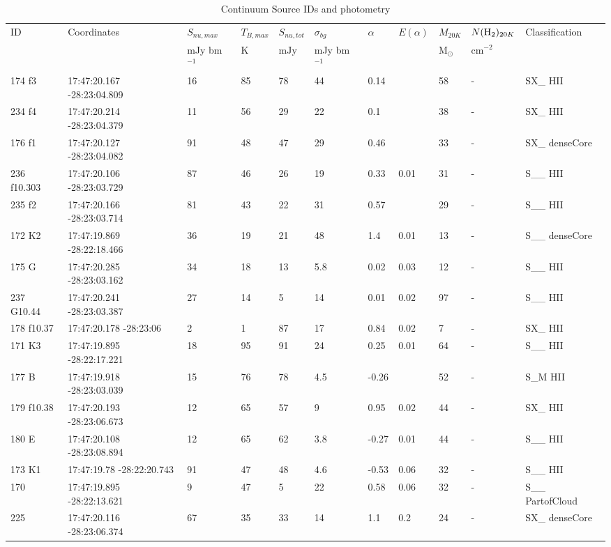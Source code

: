\begin{table}[htp]
\caption{Continuum Source IDs and photometry}
\begin{tabular}{lllllllllll}
\label{tab:photometry}
\footnotesize
ID & Coordinates & $S_{nu,max}$ & $T_{B,max}$ & $S_{nu,tot}$ & $\sigma_{bg}$ & $\alpha$ & $E(\alpha)$ & $M_{20K}$ & $N(\textrm{H}_{2})_{20 K}$ & Classification \\
 &  & mJy bm$^{-1}$ & $\mathrm{K}$ & $\mathrm{mJy}$ & mJy bm$^{-1}$ &  &  & $\mathrm{M_{\odot}}$ & $\mathrm{cm^{-2}}$ &  \\
\hline
174 f3 & 17:47:20.167 -28:23:04.809 & 16 & 85 & 78 & 44 & 0.14 &  & 58 & - & SX\_ HII \\
234 f4 & 17:47:20.214 -28:23:04.379 & 11 & 56 & 29 & 22 & 0.1 &  & 38 & - & SX\_ HII \\
176 f1 & 17:47:20.127 -28:23:04.082 & 91 & 48 & 47 & 29 & 0.46 &  & 33 & - & SX\_ denseCore \\
236 f10.303 & 17:47:20.106 -28:23:03.729 & 87 & 46 & 26 & 19 & 0.33 & 0.01 & 31 & - & S\_\_ HII \\
235 f2 & 17:47:20.166 -28:23:03.714 & 81 & 43 & 22 & 31 & 0.57 &  & 29 & - & S\_\_ HII \\
172 K2 & 17:47:19.869 -28:22:18.466 & 36 & 19 & 21 & 48 & 1.4 & 0.01 & 13 & - & S\_\_ denseCore \\
175 G & 17:47:20.285 -28:23:03.162 & 34 & 18 & 13 & 5.8 & 0.02 & 0.03 & 12 & - & S\_\_ HII \\
237 G10.44 & 17:47:20.241 -28:23:03.387 & 27 & 14 & 5 & 14 & 0.01 & 0.02 & 97 & - & S\_\_ HII \\
178 f10.37 & 17:47:20.178 -28:23:06 & 2 & 1 & 87 & 17 & 0.84 & 0.02 & 7 & - & SX\_ HII \\
171 K3 & 17:47:19.895 -28:22:17.221 & 18 & 95 & 91 & 24 & 0.25 & 0.01 & 64 & - & S\_\_ HII \\
177 B & 17:47:19.918 -28:23:03.039 & 15 & 76 & 78 & 4.5 & -0.26 &  & 52 & - & S\_M HII \\
179 f10.38 & 17:47:20.193 -28:23:06.673 & 12 & 65 & 57 & 9 & 0.95 & 0.02 & 44 & - & SX\_ HII \\
180 E & 17:47:20.108 -28:23:08.894 & 12 & 65 & 62 & 3.8 & -0.27 & 0.01 & 44 & - & S\_\_ HII \\
173 K1 & 17:47:19.78 -28:22:20.743 & 91 & 47 & 48 & 4.6 & -0.53 & 0.06 & 32 & - & S\_\_ HII \\
170 & 17:47:19.895 -28:22:13.621 & 9 & 47 & 5 & 22 & 0.58 & 0.06 & 32 & - & S\_\_ PartofCloud \\
225 & 17:47:20.116 -28:23:06.374 & 67 & 35 & 33 & 14 & 1.1 & 0.2 & 24 & - & SX\_ denseCore \\

\end{tabular}
\end{table}
